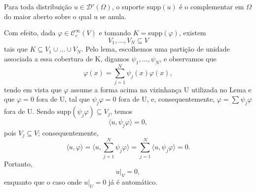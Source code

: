 \documentclass[../distribution_theory_notes.tex]{subfiles}
\begin{document}
\begin{theorem*}
	Para toda distribuição \(u\in \mathcal{D}'(\Omega )\), o suporte \(\mathrm{supp}(u)\) é o complementar em \(\Omega \) do maior aberto sobre o qual u se anula.
\end{theorem*}
\begin{proof*}
	Com efeito, dada \(\varphi \in \mathcal{C}_{c}^{\infty}(V)\) e tomando \(K=\mathrm{supp}(\varphi )\), existem
	\[
		V_1,\dotsc , V_{N}\subseteq V
	\]
	tais que \(K\subseteq V_1 \cup \dotsc \cup V_N\). Pelo lema, escolhemos uma partição de unidade associada a essa cobertura de K, digamos \(\psi_1,\dotsc , \psi_{N}\), e observamos que
	\[
		\varphi (x)=\sum\limits_{j=1}^{N}\psi_{j}(x)\varphi (x),
	\]
	tendo em vista que \(\varphi \) assume a forma acima na vizinhança U utilizada no Lema e que \(\varphi =0\) fora de U, tal que \(\psi_{j}\varphi =0\) fora de U, e, consequentemente, \(\varphi = \sum\limits_{}^{}\psi_{j}\varphi \) fora de U. Sendo \(\mathrm{supp}(\psi_{j}\varphi )\subseteq V_{j}\), temos
	\[
		\langle u, \psi_{j}\varphi  \rangle =0,
	\]
	pois \(V_{j}\subseteq V\); consequentemente,
	\[
		\langle u, \varphi  \rangle = \biggl\langle u, \sum\limits_{j=1}^{N}\psi_{j}\varphi  \biggr\rangle = \sum\limits_{j=1}^{N}\langle u, \psi_{j}\varphi  \rangle=0.
	\]
	Portanto,
	\[
		u|_{V}=0,
	\]
	enquanto que o caso onde \(u|_{U}=0\) já é automático. \qedsymbol
\end{proof*}
\end{document}
